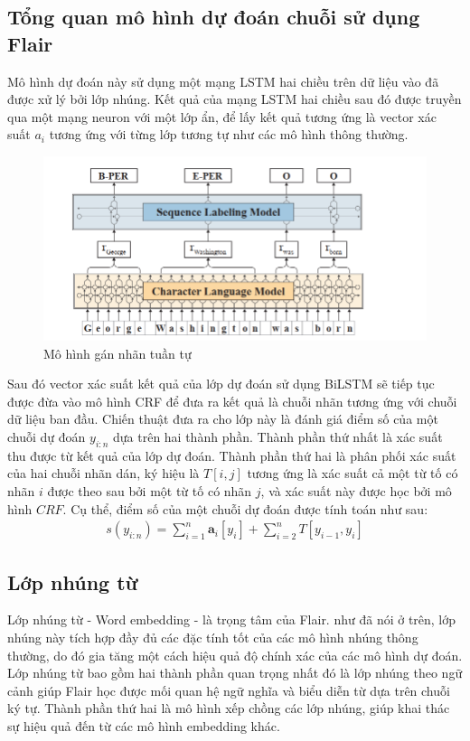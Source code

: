 \documentclass[14pt]{extreport}
\begin{document}
\subsection{Tổng quan mô hình dự đoán chuỗi sử dụng Flair}
Mô hình dự đoán này sử dụng một mạng LSTM hai chiều  trên dữ liệu vào đã được xử lý bởi lớp nhúng. Kết quả của mạng LSTM hai chiều sau đó được truyền qua một mạng neuron với một lớp ẩn, để lấy kết quả tương ứng là vector xác suất $a_{i}$ tương ứng với từng lớp tương tự như các mô hình thông thường.
\begin{figure}[H]
    \centering
    \includegraphics[scale=0.8]{image/flair_taging.PNG}
    \caption{Mô hình gán nhãn tuần tự}
    \label{fig:sequence_labeling}
\end{figure}
Sau đó vector xác suất kết quả của lớp dự đoán sử dụng BiLSTM sẽ tiếp tục được đừa vào mô hình CRF để đưa ra kết quả là chuỗi nhãn tương ứng với chuỗi dữ liệu ban đầu. Chiến thuật đưa ra cho lớp này là đánh giá điểm  số của một chuỗi dự đoán $y_{i:n}$ dựa trên hai thành phần. Thành phần thứ nhất là xác suất thu được từ kết quả của lớp dự đoán. Thành phần thứ hai là phân phối xác suất của hai chuỗi nhãn dán, ký hiệu là $T[i,j]$ tương ứng là xác suất cả một từ tố có nhãn $i$ được theo sau bởi một từ tố có nhãn $j$, và xác suất này được học bởi mô hình $CRF$. Cụ thể, điểm số của một chuỗi dự đoán được tính toán như sau:
\begin{align}
    s(y_{i:n})= \sum_{i=1}^{n} \textbf{a}_{i}[y_{i}] + \sum_{i=2}^{n}T[y_{i-1}, y_{i}]
\end{align}

\subsection{Lớp nhúng từ }
Lớp nhúng từ - Word embedding - là trọng tâm của Flair. như đã nói ở trên, lớp nhúng này tích hợp đầy đủ các đặc tính tốt của các mô hình nhúng thông thường, do đó gia tăng một cách hiệu quả độ chính xác của các mô hình dự đoán. Lớp nhúng từ bao gồm hai thành phần quan trọng nhất đó là lớp nhúng theo ngữ cảnh giúp Flair học được mối quan hệ ngữ nghĩa và biểu diễn từ dựa trên chuỗi ký tự. Thành phần thứ hai là mô hình xếp chồng các lớp nhúng, giúp khai thác sự hiệu quả đến từ các mô hình embedding khác.
\end{document}
